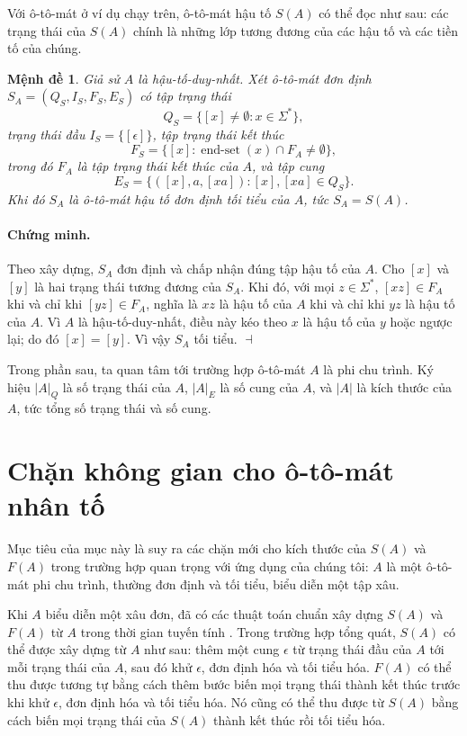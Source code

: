 \documentclass[11pt]{article}
\newtheorem{proposition}{Mệnh đề}
\newenvironment{proof}{\paragraph{Chứng minh.}}{\hfill$\dashv$\par}
\newcommand{\eps}{\epsilon}
\newcommand{\End}{\operatorname{end\text{-}set}}
\begin{document}
Với ô-tô-mát ở ví dụ chạy trên, ô-tô-mát hậu tố $S(A)$ có thể đọc như sau:
các trạng thái của $S(A)$ chính là những lớp tương đương của các hậu tố và các
tiền tố của chúng.

\begin{proposition}
Giả sử $A$ là hậu-tố-duy-nhất. Xét ô-tô-mát đơn định
$S_A=(Q_S,I_S,F_S,E_S)$ có tập trạng thái
\[
  Q_S=\{[x]\ne\emptyset:x\in\Sigma^*\},
\]
trạng thái đầu $I_S=\{[\eps]\}$, tập trạng thái kết thúc
\[
  F_S=\{[x]:\End(x)\cap F_A\ne\emptyset\},
\]
trong đó $F_A$ là tập trạng thái kết thúc của $A$, và tập cung
\[
  E_S=\{([x],a,[xa]): [x],[xa]\in Q_S\}.
\]
Khi đó $S_A$ là ô-tô-mát hậu tố đơn định tối tiểu của $A$, tức $S_A=S(A)$.
\end{proposition}

\begin{proof}
Theo xây dựng, $S_A$ đơn định và chấp nhận đúng tập hậu tố của $A$. Cho $[x]$
và $[y]$ là hai trạng thái tương đương của $S_A$. Khi đó, với mọi
$z\in\Sigma^*$, $[xz]\in F_A$ khi và chỉ khi $[yz]\in F_A$, nghĩa là $xz$ là
hậu tố của $A$ khi và chỉ khi $yz$ là hậu tố của $A$. Vì $A$ là
hậu-tố-duy-nhất, điều này kéo theo $x$ là hậu tố của $y$ hoặc ngược lại; do đó
$[x]=[y]$. Vì vậy $S_A$ tối tiểu.
\end{proof}

Trong phần sau, ta quan tâm tới trường hợp ô-tô-mát $A$ là phi chu trình. Ký
hiệu $|A|_Q$ là số trạng thái của $A$, $|A|_E$ là số cung của $A$, và $|A|$ là
kích thước của $A$, tức tổng số trạng thái và số cung.

\section{Chặn không gian cho ô-tô-mát nhân tố}

Mục tiêu của mục này là suy ra các chặn mới cho kích thước của $S(A)$ và
$F(A)$ trong trường hợp quan trọng với ứng dụng của chúng tôi: $A$ là một
ô-tô-mát phi chu trình, thường đơn định và tối tiểu, biểu diễn một tập xâu.

Khi $A$ biểu diễn một xâu đơn, đã có các thuật toán chuẩn xây dựng $S(A)$ và
$F(A)$ từ $A$ trong thời gian tuyến tính \cite{blumer-smallest,crochemore-transducers}.
Trong trường hợp tổng quát, $S(A)$ có thể được xây dựng từ $A$ như sau: thêm
một cung $\eps$ từ trạng thái đầu của $A$ tới mỗi trạng thái của $A$, sau đó
khử $\eps$, đơn định hóa và tối tiểu hóa. $F(A)$ có thể thu được tương tự bằng
cách thêm bước biến mọi trạng thái thành kết thúc trước khi khử $\eps$, đơn
định hóa và tối tiểu hóa. Nó cũng có thể thu được từ $S(A)$ bằng cách biến mọi
trạng thái của $S(A)$ thành kết thúc rồi tối tiểu hóa.
\end{document}
